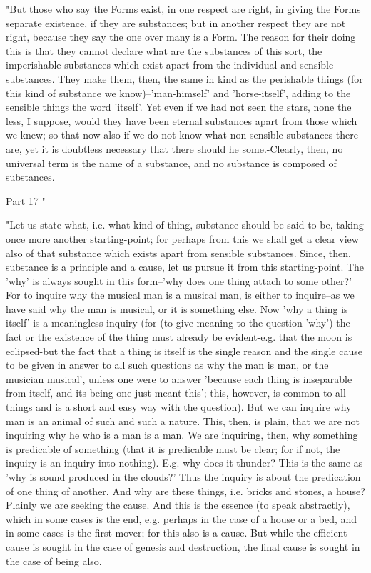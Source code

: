 "But those who say the Forms exist, in one respect are right, in giving
the Forms separate existence, if they are substances; but in another
respect they are not right, because they say the one over many is
a Form. The reason for their doing this is that they cannot declare
what are the substances of this sort, the imperishable substances
which exist apart from the individual and sensible substances. They
make them, then, the same in kind as the perishable things (for this
kind of substance we know)--'man-himself' and 'horse-itself', adding
to the sensible things the word 'itself'. Yet even if we had not seen
the stars, none the less, I suppose, would they have been eternal
substances apart from those which we knew; so that now also if we
do not know what non-sensible substances there are, yet it is doubtless
necessary that there should he some.-Clearly, then, no universal term
is the name of a substance, and no substance is composed of substances.

Part 17 "

"Let us state what, i.e. what kind of thing, substance should be said
to be, taking once more another starting-point; for perhaps from this
we shall get a clear view also of that substance which exists apart
from sensible substances. Since, then, substance is a principle and
a cause, let us pursue it from this starting-point. The 'why' is always
sought in this form--'why does one thing attach to some other?' For
to inquire why the musical man is a musical man, is either to inquire--as
we have said why the man is musical, or it is something else. Now
'why a thing is itself' is a meaningless inquiry (for (to give meaning
to the question 'why') the fact or the existence of the thing must
already be evident-e.g. that the moon is eclipsed-but the fact that
a thing is itself is the single reason and the single cause to be
given in answer to all such questions as why the man is man, or the
musician musical', unless one were to answer 'because each thing is
inseparable from itself, and its being one just meant this'; this,
however, is common to all things and is a short and easy way with
the question). But we can inquire why man is an animal of such and
such a nature. This, then, is plain, that we are not inquiring why
he who is a man is a man. We are inquiring, then, why something is
predicable of something (that it is predicable must be clear; for
if not, the inquiry is an inquiry into nothing). E.g. why does it
thunder? This is the same as 'why is sound produced in the clouds?'
Thus the inquiry is about the predication of one thing of another.
And why are these things, i.e. bricks and stones, a house? Plainly
we are seeking the cause. And this is the essence (to speak abstractly),
which in some cases is the end, e.g. perhaps in the case of a house
or a bed, and in some cases is the first mover; for this also is a
cause. But while the efficient cause is sought in the case of genesis
and destruction, the final cause is sought in the case of being also.


